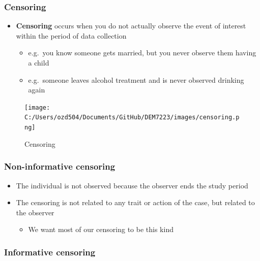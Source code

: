 \documentclass[
  letterpaper,
  DIV=11,
  numbers=noendperiod]{scrreprt}
\providecommand{\tightlist}{%
  \setlength{\itemsep}{0pt}\setlength{\parskip}{0pt}}\usepackage{longtable,booktabs,array}
\begin{document}
\hypertarget{censoring}{%
\subsubsection{Censoring}\label{censoring}}

\begin{itemize}
\tightlist
\item
  \textbf{Censoring} occurs when you do not actually observe the event
  of interest within the period of data collection

  \begin{itemize}
  \tightlist
  \item
    e.g.~you know someone gets married, but you never observe them
    having a child
  \item
    e.g.~someone leaves alcohol treatment and is never observed drinking
    again
  \end{itemize}
\end{itemize}

\begin{figure}

{\centering \texttt{[image: C:/Users/ozd504/Documents/GitHub/DEM7223/images/censoring.png]}

}

\caption{Censoring}

\end{figure}

\hypertarget{non-informative-censoring}{%
\subsubsection{Non-informative
censoring}\label{non-informative-censoring}}

\begin{itemize}
\tightlist
\item
  The individual is not observed because the observer ends the study
  period
\item
  The censoring is not related to any trait or action of the case, but
  related to the observer

  \begin{itemize}
  \tightlist
  \item
    We want most of our censoring to be this kind
  \end{itemize}
\end{itemize}

\hypertarget{informative-censoring}{%
\subsubsection{Informative censoring}\label{informative-censoring}}
\end{document}
